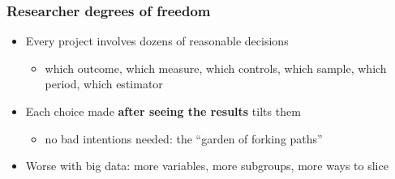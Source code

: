 \begin{frame}
\frametitle{Researcher degrees of freedom}
\centering

\begin{itemize}
  \item Every project involves dozens of reasonable decisions
  \begin{itemize}
    \item which outcome, which measure, which controls, which sample, which period, which estimator
  \end{itemize}
  \vspace{8pt}
  \item<2-> Each choice made \textbf{after seeing the results} tilts them
  \begin{itemize}
    \item no bad intentions needed: the ``garden of forking paths''
  \end{itemize}
  \vspace{8pt}
  \item<3-> Worse with big data: more variables, more subgroups, more ways to slice
\end{itemize}

\end{frame}


